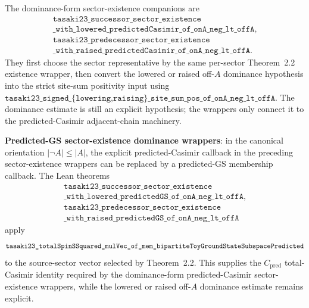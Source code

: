 \documentclass[a4paper,11pt]{article}
\begin{document}
The dominance-form sector-existence companions are
\[
\begin{gathered}
\texttt{tasaki23\_successor\_sector\_existence}\\
\texttt{\_with\_lowered\_predictedCasimir\_of\_onA\_neg\_lt\_offA},\\
\texttt{tasaki23\_predecessor\_sector\_existence}\\
\texttt{\_with\_raised\_predictedCasimir\_of\_onA\_neg\_lt\_offA}.
\end{gathered}
\]
They first choose the sector representative by the same per-sector
Theorem~2.2 existence wrapper, then convert the lowered or raised
off-\(A\) dominance hypothesis into the strict site-sum positivity input
using
\(\texttt{tasaki23\_signed\_\{lowering,raising\}\_site\_sum\_pos\_of\_onA\_neg\_lt\_offA}\).
The dominance estimate is still an explicit hypothesis; the wrappers
only connect it to the predicted-Casimir adjacent-chain machinery.

\textbf{Predicted-GS sector-existence dominance wrappers}: in the
canonical orientation \(|\neg A|\le |A|\), the explicit
predicted-Casimir callback in the preceding sector-existence wrappers
can be replaced by a predicted-GS membership callback.  The Lean
theorems
\[
\begin{gathered}
\texttt{tasaki23\_successor\_sector\_existence}\\
\texttt{\_with\_lowered\_predictedGS\_of\_onA\_neg\_lt\_offA},\\
\texttt{tasaki23\_predecessor\_sector\_existence}\\
\texttt{\_with\_raised\_predictedGS\_of\_onA\_neg\_lt\_offA}
\end{gathered}
\]
apply
\[
\texttt{tasaki23\_totalSpinSSquared\_mulVec\_of\_mem}\\
\texttt{\_bipartiteToyGroundStateSubspacePredicted}
\]
to the source-sector vector selected by Theorem~2.2.  This supplies the
\(C_{\mathrm{pred}}\) total-Casimir identity required by the
dominance-form predicted-Casimir sector-existence wrappers, while the
lowered or raised off-\(A\) dominance estimate remains explicit.
\end{document}
